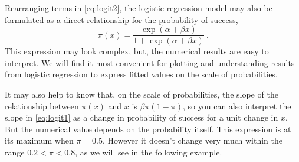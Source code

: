 Rearranging terms in \eqref{eq:logit2}, the logistic regression model may also be formulated as a direct relationship for the probability of success,
\begin{equation}\label{eq:logit3}
\pi(x) = \frac{\exp (\alpha + \beta x)}{1+ \exp (\alpha + \beta x) } \:.
\end{equation}
This expression may look complex, but, the numerical results are
easy to interpret.
We will find it most convenient for plotting and understanding results
from logistic regression to express fitted values on the scale of
probabilities.

It may also help to know that, on the scale of probabilities, the 
slope of the relationship between $\pi(x)$ and $x$ is
$\beta \pi (1-\pi)$, so you can also interpret the slope in
\eqref{eq:logit1} as a change in probability of success for a unit
change in $x$. But the numerical value depends on the probability itself.
This expression is at its maximum when $\pi = 0.5$.  However
it doesn't change very much within the range $0.2 < \pi < 0.8$, as we
will see in the following example.

